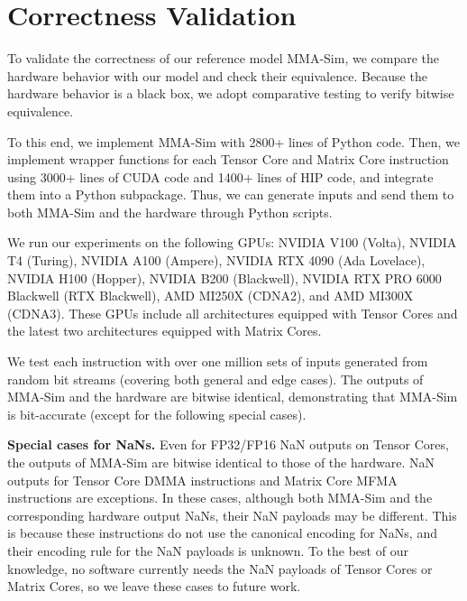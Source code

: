 \section{Correctness Validation}
\label{sec:correctness}

To validate the correctness of our reference model MMA-Sim, we compare the hardware behavior with our model and check their equivalence. Because the hardware behavior is a black box, we adopt comparative testing to verify bitwise equivalence.

To this end, we implement MMA-Sim with 2800+ lines of Python code. Then, we implement wrapper functions for each Tensor Core and Matrix Core instruction using 3000+ lines of CUDA code and 1400+ lines of HIP code, and integrate them into a Python subpackage. Thus, we can generate inputs and send them to both MMA-Sim and the hardware through Python scripts. 

We run our experiments on the following GPUs: NVIDIA V100 (Volta), NVIDIA T4 (Turing), NVIDIA A100 (Ampere), NVIDIA RTX 4090 (Ada Lovelace), NVIDIA H100 (Hopper), NVIDIA B200 (Blackwell), NVIDIA RTX PRO 6000 Blackwell (RTX Blackwell), AMD MI250X (CDNA2), and AMD MI300X (CDNA3). These GPUs include all architectures equipped with Tensor Cores and the latest two architectures equipped with Matrix Cores.

We test each instruction with over one million sets of inputs generated from random bit streams (covering both general and edge cases). The outputs of MMA-Sim and the hardware are bitwise identical, demonstrating that MMA-Sim is bit-accurate (except for the following special cases).

\textbf{Special cases for NaNs.} Even for FP32/FP16 NaN outputs on Tensor Cores, the outputs of MMA-Sim are bitwise identical to those of the hardware. NaN outputs for Tensor Core DMMA instructions and Matrix Core MFMA instructions are exceptions. In these cases, although both MMA-Sim and the corresponding hardware output NaNs, their NaN payloads may be different. This is because these instructions do not use the canonical encoding for NaNs, and their encoding rule for the NaN payloads is unknown. To the best of our knowledge, no software currently needs the NaN payloads of Tensor Cores or Matrix Cores, so we leave these cases to future work.
